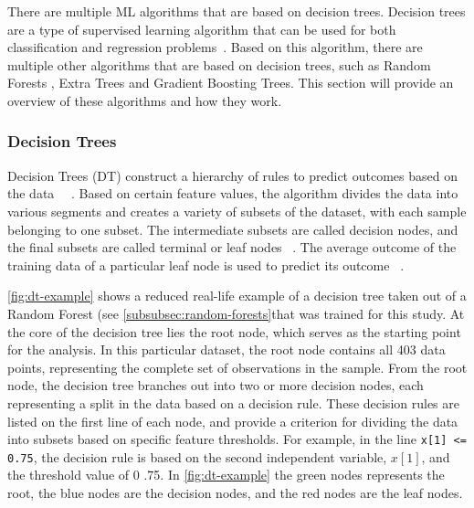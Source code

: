 There are multiple \ac{ML} algorithms that are based on decision trees.
Decision trees are a type of supervised learning algorithm that can be used for both classification and regression
problems~\cite[p. 70]{muller2016introduction}.
Based on this algorithm, there are multiple other algorithms that are based on decision trees, such as Random Forests
, Extra Trees and Gradient Boosting Trees.
This section will provide an overview of these algorithms and how they work.


\subsubsection{Decision Trees}
Decision Trees (DT) construct a hierarchy of rules to predict outcomes based on the
data
~\cite[p. 70]{muller2016introduction}~\cite[p. 253]{shaik2019brief}.
Based on certain feature values, the algorithm divides the data into various segments and creates a variety of
subsets of the dataset, with each sample belonging to one subset.
The intermediate subsets are called decision nodes, and the final subsets are called terminal or leaf nodes
~\cite[p. 358]{geron2022hands}.
The average outcome of the training data of a particular leaf node is used to predict its
outcome
~\cite[p. 70--72]{muller2016introduction}.

\cref{fig:dt-example} shows a reduced real-life example of a decision tree taken out of a Random Forest
(see \cref{subsubsec:random-forests}that was trained for this study.
At the core of the decision tree lies the root node, which serves as the starting point for the analysis.
In this particular dataset, the root node contains all 403 data points, representing the complete set of observations
in the sample.
From the root node, the decision tree branches out into two or more decision nodes, each representing a split in the
data based on a decision rule.
These decision rules are listed on the first line of each node, and provide a criterion for dividing the data into
subsets based on specific feature thresholds.
For example, in the line \texttt{x[1] <= 0.75}, the decision rule is based on the second independent variable,
$x[1]$, and the threshold value of 0 .75.
In \cref{fig:dt-example} the green nodes represents the root, the blue nodes are the decision nodes, and the red
nodes are the leaf nodes.

